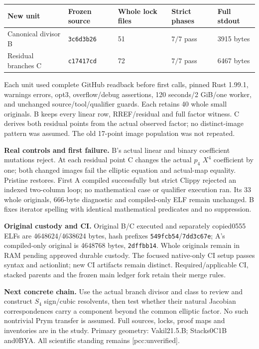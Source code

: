 \documentclass[10pt,a4paper]{article}
\begin{document}
\begin{center}
\begin{tabular}{lllll}
\toprule
New unit & Frozen source & Whole lock files & Strict phases & Full stdout\\
\midrule
Canonical divisor B & \texttt{3c6d3b26} & 51 & $7/7$ pass & 3915 bytes\\
Residual branches C & \texttt{c17417cd} & 72 & $7/7$ pass & 6467 bytes\\
\bottomrule
\end{tabular}
\end{center}
Each unit used complete GitHub readback before first calls, pinned
Rust 1.99.1, warnings errors, opt3, overflow/debug assertions,
120 seconds/2 GiB/one worker, and unchanged source/tool/qualifier guards.
Each retains 40 whole small originals. B keeps every linear row,
RREF/residual and full factor witness. C derives both residual points
from the actual observed factor; no distinct-image pattern was assumed.
The old 17-point image population was not repeated.

\textbf{Real controls and first failure.} B's actual linear and binary
coefficient mutations reject. At each residual point C changes the actual
$p_4$ $X^4$ coefficient by one; both changed images fail the elliptic
equation and actual-map equality. Pristine restores. First A compiled
successfully but strict Clippy rejected an indexed two-column loop;
no mathematical case or qualifier execution ran. Its 33 whole originals,
666-byte diagnostic and compiled-only ELF remain unchanged. B fixes
iterator spelling with identical mathematical predicates and no suppression.

\textbf{Original custody and CI.} Original B/C executed and separately
copied0555 ELFs are 4648624/4638624 bytes, hash prefixes
\texttt{549fcb54}/\texttt{7dd3c67e}; A's compiled-only original is
4648768 bytes, \texttt{2dffbb14}. Whole originals remain in RAM pending
approved durable custody. The focused native-only CI setup passes syntax
and actionlint; new CI artifacts remain distinct. Required/applicable CI,
stacked parents and the frozen main ledger fork retain their merge rules.

\textbf{Next concrete chain.} Use the actual branch divisor and class to
review and construct $S_4$ sign/cubic resolvents, then test whether their
natural Jacobian correspondences carry a component beyond the common
elliptic factor. No such nontrivial Prym transfer is assumed. Full sources,
locks, proof maps and inventories are in the study. Primary geometry:
Vakil21.5.B; Stacks0C1B and0BYA. All scientific standing remains
[pcc:unverified].
\end{document}
